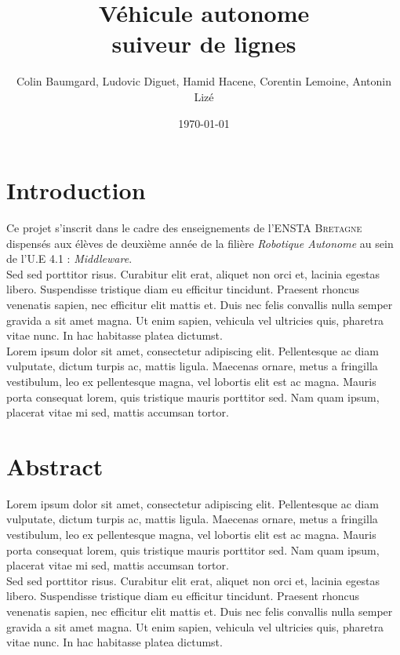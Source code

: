 \documentclass[12pt, openany]{report}
\title{Véhicule autonome \\ suiveur de lignes}
\author{Colin Baumgard, Ludovic Diguet, Hamid Hacene, Corentin Lemoine, Antonin Lizé}
\date{\today}
\begin{document}
\maketitle
\tableofcontents
\pagebreak

\section*{Introduction}
Ce projet s'inscrit dans le cadre des enseignements de l'\textsc{ENSTA Bretagne} dispensés aux élèves de deuxième année de la filière \textit{Robotique Autonome} au sein de l'U.E 4.1 : \textit{Middleware}.\\

Sed sed porttitor risus. Curabitur elit erat, aliquet non orci et, lacinia egestas libero. Suspendisse tristique diam eu efficitur tincidunt. Praesent rhoncus venenatis sapien, nec efficitur elit mattis et. Duis nec felis convallis nulla semper gravida a sit amet magna. Ut enim sapien, vehicula vel ultricies quis, pharetra vitae nunc. In hac habitasse platea dictumst.\\

Lorem ipsum dolor sit amet, consectetur adipiscing elit. Pellentesque ac diam vulputate, dictum turpis ac, mattis ligula. Maecenas ornare, metus a fringilla vestibulum, leo ex pellentesque magna, vel lobortis elit est ac magna. Mauris porta consequat lorem, quis tristique mauris porttitor sed. Nam quam ipsum, placerat vitae mi sed, mattis accumsan tortor.\\

\section*{Abstract}
Lorem ipsum dolor sit amet, consectetur adipiscing elit. Pellentesque ac diam vulputate, dictum turpis ac, mattis ligula. Maecenas ornare, metus a fringilla vestibulum, leo ex pellentesque magna, vel lobortis elit est ac magna. Mauris porta consequat lorem, quis tristique mauris porttitor sed. Nam quam ipsum, placerat vitae mi sed, mattis accumsan tortor.\\

Sed sed porttitor risus. Curabitur elit erat, aliquet non orci et, lacinia egestas libero. Suspendisse tristique diam eu efficitur tincidunt. Praesent rhoncus venenatis sapien, nec efficitur elit mattis et. Duis nec felis convallis nulla semper gravida a sit amet magna. Ut enim sapien, vehicula vel ultricies quis, pharetra vitae nunc. In hac habitasse platea dictumst.
\end{document}
